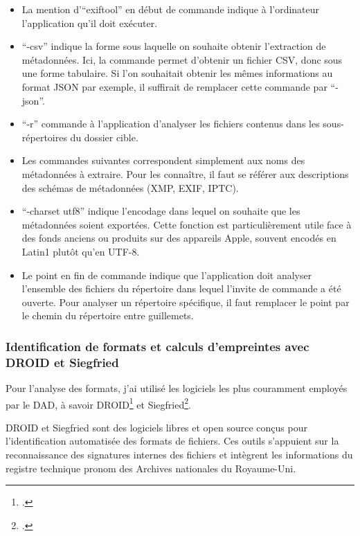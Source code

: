 \begin{itemize}
	\item La mention d'\enquote{exiftool} en début de commande indique à l'ordinateur l'application qu'il doit exécuter.
	\item \enquote{-csv} indique la forme sous laquelle on souhaite obtenir l'extraction de métadonnées. Ici, la commande permet d'obtenir un fichier CSV, donc sous une forme tabulaire. Si l'on souhaitait obtenir les mêmes informations au format JSON par exemple, il suffirait de remplacer cette commande par \enquote{-json}.
	\item \enquote{-r} commande à l'application d’analyser les fichiers contenus dans les sous-répertoires du dossier cible.
	\item Les commandes suivantes correspondent simplement aux noms des métadonnées à extraire. Pour les connaître, il faut se référer aux descriptions des schémas de métadonnées (XMP, EXIF, IPTC).
	\item \enquote{-charset utf8} indique l'encodage dans lequel on souhaite que les métadonnées soient exportées. Cette fonction est particulièrement utile face à des fonds anciens ou produits sur des appareils Apple, souvent encodés en Latin1 plutôt qu'en UTF-8.
	\item Le point en fin de commande indique que l'application doit analyser l’ensemble des fichiers du répertoire dans lequel l’invite de commande a été ouverte. Pour analyser un répertoire spécifique, il faut remplacer le point par le chemin du répertoire entre guillemets.
\end{itemize}


\subsubsection*{Identification de formats et calculs d'empreintes avec DROID et Siegfried}

Pour l'analyse des formats, j'ai utilisé les logiciels les plus couramment employés par le DAD, à savoir DROID\footcite{droid2024} et Siegfried\footcite{itforarchivists2024}.

DROID et Siegfried sont des logiciels libres et open source conçus pour l'identification automatisée des formats de fichiers. Ces outils s'appuient sur la reconnaissance des signatures internes des fichiers et intègrent les informations du registre technique \gls{pronom} des Archives nationales du Royaume-Uni.

